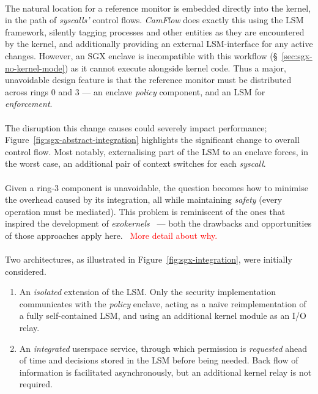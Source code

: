 \paragraph{} The natural location for a reference monitor is embedded directly into the kernel, in the path of \textit{syscalls'} control flows. \textit{CamFlow} does exactly this using the LSM framework, silently tagging processes and other entities as they are encountered by the kernel, and additionally providing an external LSM-interface for any active changes. However, an SGX enclave is incompatible with this workflow (§~\ref{sec:sgx-no-kernel-mode}) as it cannot execute alongside kernel code. Thus a major, unavoidable design feature is that the reference monitor must be distributed across rings 0 and 3 --- an enclave \textit{policy} component, and an LSM for \textit{enforcement}.

\paragraph{} The disruption this change causes could severely impact performance; Figure~\ref{fig:sgx-abstract-integration} highlights the significant change to overall control flow. Most notably, externalising part of the LSM to an enclave forces, in the worst case, an additional pair of context switches for each \textit{syscall}.

\paragraph{} Given a ring-3 component is unavoidable, the question becomes how to minimise the overhead caused by its integration, all while maintaining \textit{safety} (every operation must be mediated). This problem is reminiscent of the ones that inspired the development of \textit{exokernels}~\cite{10.1145/224056.224076} --- both the drawbacks and opportunities of those approaches apply here.~\cite{10.1145/269005.266644} \textcolor{red}{More detail about why.}

\paragraph{} Two architectures, as illustrated in Figure~\ref{fig:sgx-integration}, were initially considered. 

\begin{enumerate}
    \item An \textit{isolated} extension of the LSM. Only the security implementation communicates with the \textit{policy} enclave, acting as a na\"{i}ve reimplementation of a fully self-contained LSM, and using an additional kernel module as an I/O relay.
    \item An \textit{integrated} userspace service, through which permission is \textit{requested} ahead of time and decisions stored in the LSM before being needed. Back flow of information is facilitated asynchronously, but an additional kernel relay is not required.
\end{enumerate}



